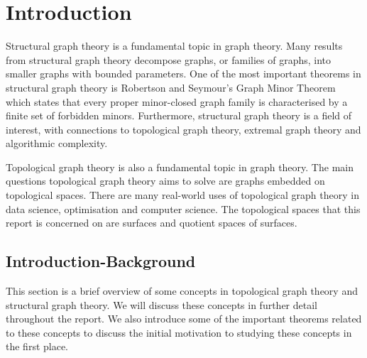 \chapter{Introduction}\label{sec:introduction}
Structural graph theory is a fundamental topic in graph theory. Many results from structural graph theory decompose graphs, or families of graphs, into smaller graphs with bounded parameters. One of the most important theorems in structural graph theory is Robertson and Seymour's Graph Minor Theorem \cite{robertsonGraphMinorsXX2004} which states that every proper minor-closed graph family is characterised by a finite set of forbidden minors. Furthermore, structural graph theory is a field of interest, with connections to topological graph theory, extremal graph theory and algorithmic complexity. 

Topological graph theory is also a fundamental topic in graph theory. The main questions topological graph theory aims to solve are graphs embedded on topological spaces. There are many real-world uses of topological graph theory in data science, optimisation and computer science. The topological spaces that this report is concerned on are surfaces and quotient spaces of surfaces. 





\section{Introduction-Background}
This section is a brief overview of some concepts in topological graph theory and structural graph theory. We will discuss these concepts in further detail throughout the report. We also introduce some of the important theorems related to these concepts to discuss the initial motivation to studying these concepts in the first place. 















